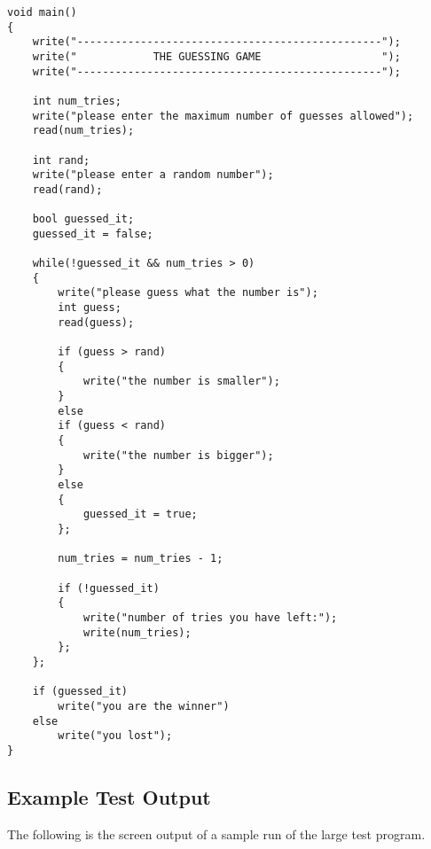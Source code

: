 \documentclass{report}
\begin{document}
\begin{verbatim}
void main()
{
    write("------------------------------------------------");
    write("            THE GUESSING GAME                   ");
    write("------------------------------------------------");

    int num_tries;
    write("please enter the maximum number of guesses allowed");
    read(num_tries);

    int rand;
    write("please enter a random number");
    read(rand);

    bool guessed_it;
    guessed_it = false;

    while(!guessed_it && num_tries > 0)
    {
        write("please guess what the number is");
        int guess;
        read(guess);

        if (guess > rand)
        {
            write("the number is smaller");
        }
        else
        if (guess < rand)
        {
            write("the number is bigger");
        }
        else
        {
            guessed_it = true;
        };

        num_tries = num_tries - 1;

        if (!guessed_it)
        {
            write("number of tries you have left:");
            write(num_tries);
        };
    };

    if (guessed_it)
        write("you are the winner")
    else
        write("you lost");
}
\end{verbatim}

\newpage

\subsection{Example Test Output}

The following is the screen output of a sample run of the large test
program.
\end{document}
